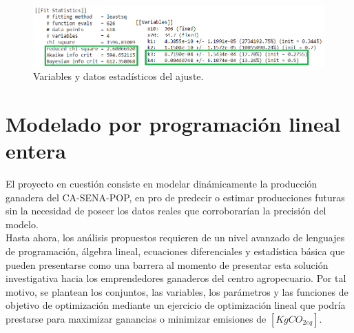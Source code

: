 \begin{itemize}
        \begin{figure}[H]
            \centering
            \includegraphics[scale=0.53]{img/ajustemodSolstats.png}
            \caption{Variables y datos estadísticos del ajuste.}
            \label{ajustemodSolstatspng}
        \end{figure}
        
        
    
    
\end{itemize}





\section{Modelado por programación lineal entera} \label{linprogmod}
El proyecto en cuestión consiste en modelar dinámicamente la producción ganadera del CA-SENA-POP, en pro de predecir o estimar producciones futuras sin la necesidad de poseer los datos reales que corroborarían la precisión del modelo.\\

Hasta ahora, los análisis propuestos requieren de un nivel avanzado de lenguajes de programación, álgebra lineal, ecuaciones diferenciales y estadística básica que pueden presentarse como una barrera al momento de presentar esta solución investigativa hacia los emprendedores ganaderos del centro agropecuario. Por tal motivo, se plantean los conjuntos, las variables, los parámetros y las funciones de objetivo de optimización mediante un ejercicio de optimización lineal que podría prestarse para maximizar ganancias o minimizar emisiones de $[KgCO_{2eq}]$. \\

